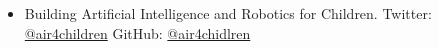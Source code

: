 \documentclass{mycv}
\begin{document}
\begin{itemize}
\item Building Artificial Intelligence and Robotics for Children.
	Twitter: \href{https://twitter.com/air4children}{\faTwitter @air4children}
	GitHub: \href{https://github.com/air4children}{\faGithub* @air4chidlren}



\end{itemize}




\end{document}
